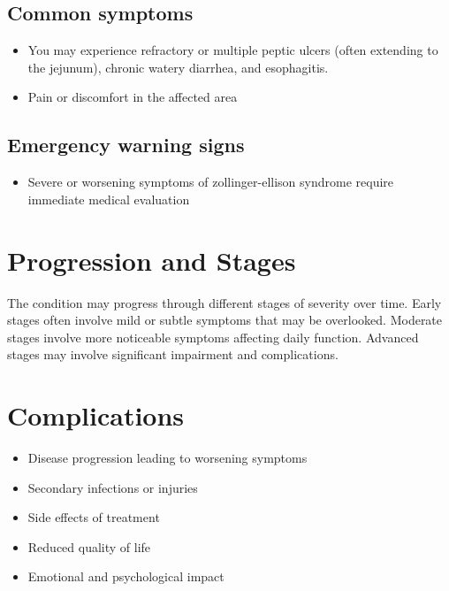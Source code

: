 \subsection{Common symptoms}
\begin{itemize}[noitemsep]
  \item You may experience refractory or multiple peptic ulcers (often extending to the jejunum), chronic watery diarrhea, and esophagitis.

  \item Pain or discomfort in the affected area
  \end{itemize}

\subsection{Emergency warning signs}
\begin{itemize}[noitemsep]
  \item Severe or worsening symptoms of zollinger-ellison syndrome require immediate medical evaluation
\end{itemize}
\section{Progression and Stages}
The condition may progress through different stages of severity over time. Early stages often involve mild or subtle symptoms that may be overlooked. Moderate stages involve more noticeable symptoms affecting daily function. Advanced stages may involve significant impairment and complications.
\section{Complications}
\begin{itemize}[noitemsep]
  \item Disease progression leading to worsening symptoms
  \item Secondary infections or injuries
  \item Side effects of treatment
  \item Reduced quality of life
  \item Emotional and psychological impact
\end{itemize}
